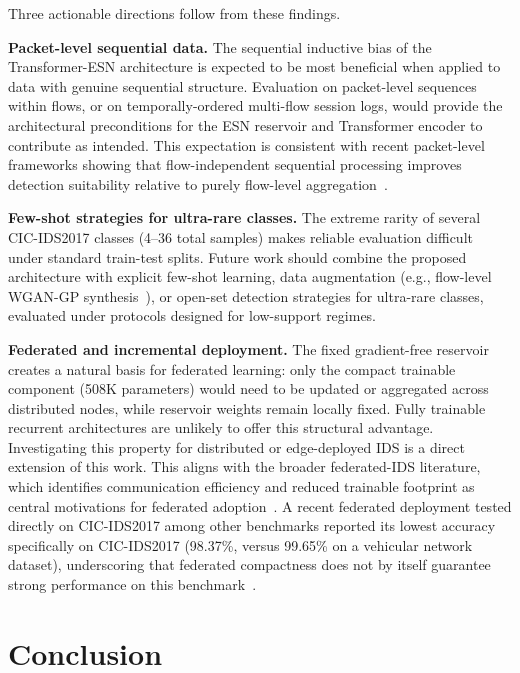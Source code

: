 \documentclass[5p,times]{elsarticle}
\begin{document}
	Three actionable directions follow from these findings.
	
	\textbf{Packet-level sequential data.}
	The sequential inductive bias of the Transformer-ESN architecture is
	expected to be most beneficial when applied to data with genuine
	sequential structure. Evaluation on packet-level sequences within flows,
	or on temporally-ordered multi-flow session logs, would provide the
	architectural preconditions for the ESN reservoir and Transformer
	encoder to contribute as intended. This expectation is consistent with
	recent packet-level frameworks showing that flow-independent sequential
	processing improves detection suitability relative to purely flow-level
	aggregation~\cite{hore2024sequential}.
	
	\textbf{Few-shot strategies for ultra-rare classes.}
	The extreme rarity of several CIC-IDS2017 classes (4--36 total samples)
	makes reliable evaluation difficult under standard train-test splits.
	Future work should combine the proposed architecture with explicit
	few-shot learning, data augmentation (e.g., flow-level WGAN-GP
	synthesis~\cite{thakkar2020}), or open-set detection strategies for
	ultra-rare classes, evaluated under protocols designed for low-support
	regimes.
	
	\textbf{Federated and incremental deployment.}
	The fixed gradient-free reservoir creates a natural basis for federated
	learning: only the compact trainable component (508K parameters) would
	need to be updated or aggregated across distributed nodes, while
	reservoir weights remain locally fixed. Fully trainable recurrent
	architectures are unlikely to offer this structural advantage.
	Investigating this property for distributed or edge-deployed IDS is a
	direct extension of this work. This aligns with the broader federated-IDS
	literature, which identifies communication efficiency and reduced
	trainable footprint as central motivations for federated
	adoption~\cite{hernandezramos2025federated}. A recent federated
	deployment tested directly on CIC-IDS2017 among other benchmarks
	reported its lowest accuracy specifically on CIC-IDS2017 (98.37\%,
	versus 99.65\% on a vehicular network dataset), underscoring that
	federated compactness does not by itself guarantee strong performance
	on this benchmark~\cite{almansour2025adaptive}.
	
	\section{Conclusion}
	\label{sec:conclusion}
	
\end{document}
